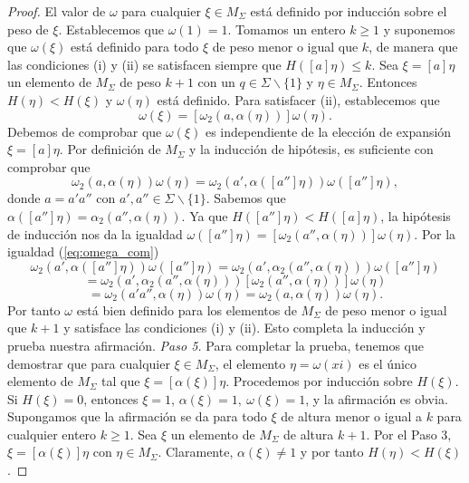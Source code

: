 \documentclass[12pt]{book}
\theoremstyle{definition}
\begin{document}
\begin{proof}
El valor de $\omega$ para cualquier $\xi\in M_\Sigma$ está definido por inducción sobre el peso de $\xi$. Establecemos que $\omega(1)=1$. Tomamos un entero $k\geq 1$ y suponemos que $\omega(\xi)$ está definido para todo $\xi$ de peso menor o igual que $k$, de manera que las condiciones (i) y (ii) se satisfacen siempre que $H([a]\eta)\leq k$. Sea $\xi=[a]\eta$ un elemento de $M_\Sigma$ de peso $k+1$ con un $q\in\Sigma \backslash \{1\}$ y $\eta\in M_\Sigma$. Entonces $H(\eta)< H(\xi)$ y $\omega(\eta)$ está definido. Para satisfacer (ii), establecemos que 
$$\omega(\xi)=[\omega_2(a,\alpha(\eta))]\omega(\eta).$$
Debemos de comprobar que $\omega(\xi)$ es independiente de la elección de expansión $\xi=[a]\eta$. Por definición de $M_\Sigma$ y la inducción de hipótesis, es suficiente con comprobar que
$$\omega_2(a,\alpha(\eta))\omega(\eta)=\omega_2(a',\alpha([a'']\eta))\omega([a'']\eta),$$
donde $a=a'a''$ con $a',a''\in\Sigma\backslash\{1\}$. Sabemos que $\alpha([a'']\eta)=\alpha_2(a'',\alpha(\eta))$. Ya que $H([a'']\eta) < H([a]\eta)$, la hipótesis de inducción nos da la igualdad $\omega([a'']\eta)=[\omega_2(a'',\alpha(\eta))]\omega(\eta)$. Por la igualdad (\ref{eq:omega_com})
$$\omega_2(a',\alpha([a'']\eta))\omega([a'']\eta)=\omega_2(a',\alpha_2(a'',\alpha(\eta)))\omega([a'']\eta)$$
$$= \omega_2(a',\alpha_2(a'',\alpha(\eta)))[\omega_2(a'',\alpha(\eta))]\omega(\eta)$$
$$ =\omega_2(a'a'',\alpha(\eta))\omega(\eta)=  \omega_2(a,\alpha(\eta))\omega(\eta).$$
Por tanto $\omega$ está bien definido para los elementos de $M_\Sigma$ de peso menor o igual que $k+1$ y satisface las condiciones (i) y (ii). Esto completa la inducción y prueba nuestra afirmación.
\newline
\newline
\textit{Paso 5.} Para completar la prueba, tenemos que demostrar que para cualquier $\xi\in M_\Sigma$, el elemento $\eta = \omega(xi)$ es el único elemento de $M_\Sigma$ tal que $\xi = [\alpha(\xi)]\eta$. Procedemos por inducción sobre $H(\xi)$. Si $H(\xi) = 0$, entonces $\xi = 1$, $\alpha(\xi) = 1,\ \omega(\xi) = 1$, y la afirmación es obvia. Supongamos que la afirmación se da para todo $\xi$ de altura menor o igual a $k$ para cualquier entero $k\geq 1$. Sea $\xi$ un elemento de $M_\Sigma$ de  altura $k+1$. Por el Paso 3, $\xi=[\alpha(\xi)]\eta$ con $\eta\in M_\Sigma$. Claramente, $\alpha(\xi)\neq 1$ y por tanto $H(\eta) < H(\xi)$.


\end{proof}
\end{document}
